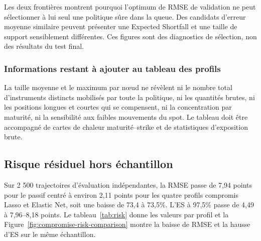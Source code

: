 

Les deux frontières montrent pourquoi l'optimum de RMSE de validation ne peut sélectionner à lui seul une politique sûre dans la queue. Des candidats d'erreur moyenne similaire peuvent présenter une Expected Shortfall et une taille de support sensiblement différentes. Ces figures sont des diagnostics de sélection, non des résultats du test final.

\subsubsection*{Informations restant à ajouter au tableau des profils}

La taille moyenne et le maximum par nœud ne révèlent ni le nombre total d'instruments distincts mobilisés par toute la politique, ni les quantités brutes, ni les positions longues et courtes qui se compensent, ni la concentration par maturité, ni la sensibilité aux faibles mouvements du spot. Le tableau doit être accompagné de cartes de chaleur maturité--strike et de statistiques d'exposition brute.

\subsection{Risque résiduel hors échantillon}

Sur 2 500 trajectoires d'évaluation indépendantes, la RMSE passe de 7,94 points pour le passif centré à environ 2,11 points pour les quatre profils compromis Lasso et Elastic Net, soit une baisse de 73,4 à 73,5\%. L'ES à 97,5\% passe de 4,49 à 7,96--8,18 points. Le tableau~\ref{tab:risk} donne les valeurs par profil et la Figure~\ref{fig:compromise-risk-comparison} montre la baisse de RMSE et la hausse d'ES sur le même échantillon.

